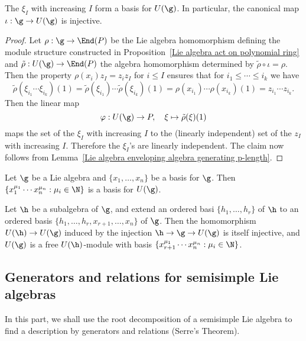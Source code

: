 \begin{proposition}
The $\xi_I$ with increasing $I$ form a basis for $U(\g)$. In particular, the canonical map $\iota:\g\to U(\g)$ is injective.
\end{proposition}
\begin{proof}
Let $\rho:\g\to\End(P)$ be the Lie algebra homomorphism defining the module structure constructed in Proposition~\ref{Lie algebra act on polynomial ring} and $\tilde{\rho}:U(\g)\to\End(P)$ the algebra homomorphism determined by $\tilde{\rho}\circ\iota=\rho$. Then the property $\rho(x_i)z_I=z_iz_I$ for $i\leq I$ ensures that for $i_1\leq\cdots\leq i_k$ we have
\[\tilde{\rho}(\xi_{i_1}\cdots\xi_{i_k})(1)=\tilde{\rho}(\xi_{i_1})\cdots\tilde{\rho}(\xi_{i_k})(1)=\rho(x_{i_1})\cdots\rho(x_{i_k})(1)=z_{i_1}\cdots z_{i_k}.\]
Then the linear map
\[\varphi:U(\g)\to P,\quad\xi\mapsto\tilde{\rho}(\xi)(1)\]
maps the set of the $\xi_I$ with increasing $I$ to the (linearly independent) set of the $z_I$ with increasing $I$. Therefore the $\xi_I$'s are linearly independent. The claim now follows from Lemma~\ref{Lie algebra enveloping algebra generating p-length}.
\end{proof}
\begin{theorem}
Let $\g$ be a Lie algebra and $\{x_1,\dots,x_n\}$ be a basis for $\g$. Then $\{x_1^{\mu_1}\cdots x_n^{\mu_n}:\mu_i\in\N\}$ is a basis for $U(\g)$.
\end{theorem}
\begin{corollary}\label{Lie algebra PBW Theorem on subalgebra}
Let $\h$ be a subalgebra of $\g$, and extend an ordered basi $\{h_1,\dots,h_r\}$ of $\h$ to an ordered basis $\{h_1,\dots,h_r,x_{r+1},\dots,x_n\}$ of $\g$. Then the homomorphism $U(\h)\to U(\g)$ induced by the injection $\h\to\g\to U(\g)$ is itself injective, and $U(\g)$ is a free $U(\h)$-module with basis $\{x_{r+1}^{\mu_1}\cdots x_n^{\mu_n}:\mu_i\in\N\}$.
\end{corollary}
\subsection{Generators and relations for semisimple Lie algebras}
In this part, we shall use the root decomposition of a semisimple Lie algebra to find a description by generators and relations (Serre's Theorem).
